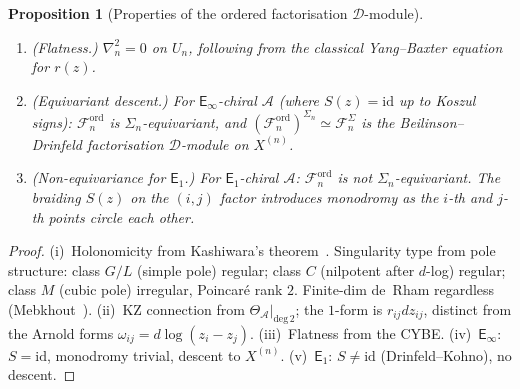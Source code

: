 \documentclass[11pt,reqno]{amsart}
\newtheorem{proposition}[theorem]{Proposition}
\theoremstyle{definition}
\theoremstyle{remark}
\newcommand{\cA}{\mathcal{A}}
\newcommand{\cD}{\mathcal{D}}
\newcommand{\cF}{\mathcal{F}}
\newcommand{\Eone}{\mathsf{E}_{1}}
\newcommand{\Einf}{\mathsf{E}_{\infty}}
\newcommand{\id}{\mathrm{id}}
\numberwithin{equation}{section}
\begin{document}
\begin{proposition}[Properties of the ordered
factorisation $\cD$-module]
\begin{enumerate}[label=\textup{(\roman*)}]
  For affine Kac--Moody at level $k$, two equivalent
  conventions coexist. In the trace-form convention,
  with $\Omega_{\mathrm{tr}}$ the Casimir built from the
  normalised trace form
  $(X,Y)_{\mathrm{tr}}
  = \mathrm{tr}(\mathrm{ad}_X \circ \mathrm{ad}_Y)
  /(2h^\vee)$:
  \begin{equation}\label{eq:kz-km}
    \nabla_n^{\mathrm{KM}}
    = \nabla^{\boxtimes n} - \sum_{i < j}
    \frac{k\,(\Omega_{\mathrm{tr}})_{ij}}{z_i - z_j}
    \, d(z_i - z_j).
  \end{equation}
  In the KZ normalisation, with $\Omega$ the inverse
  Killing form Casimir:
  \begin{equation}\label{eq:kz-km-kz}
    \nabla_n^{\mathrm{KM}}
    = \nabla^{\boxtimes n} - \sum_{i < j}
    \frac{\Omega_{ij}}{(k + h^\vee)(z_i - z_j)}
    \, d(z_i - z_j).
  \end{equation}
  The bridge identity
  $k\,(\Omega_{\mathrm{tr}})_{ij}
  = \Omega_{ij}/(k + h^\vee)$
  equates the two at generic~$k$
  (see~\cite[\S III.2]{Lorgat26I}).
  Both have a \emph{simple pole} along $\Delta_{ij}$:
  the connection is Fuchsian.
\item \textup{(Flatness.)} $\nabla_n^2 = 0$ on $U_n$,
  following from the classical Yang--Baxter equation
  for $r(z)$.
\item \textup{(Equivariant descent.)}
  For $\Einf$-chiral $\cA$ \textup{(}where $S(z) = \id$
  up to Koszul signs\textup{)}:
  $\cF_n^{\mathrm{ord}}$
  is $\Sigma_n$-equivariant, and
  $(\cF_n^{\mathrm{ord}})^{\Sigma_n}
  \simeq \cF_n^{\Sigma}$
  is the Beilinson--Drinfeld factorisation $\cD$-module
  on $X^{(n)}$.
\item \textup{(Non-equivariance for $\Eone$.)}
  For $\Eone$-chiral $\cA$:
  $\cF_n^{\mathrm{ord}}$ is \emph{not}
  $\Sigma_n$-equivariant. The braiding $S(z)$ on the
  $(i,j)$ factor introduces monodromy as the $i$-th and
  $j$-th points circle each other.
\end{enumerate}
\end{proposition}

\begin{proof}
(i)~Holonomicity from Kashiwara's theorem~\cite{Kashiwara03}.
Singularity type from pole structure: class $G/L$ (simple
pole) regular; class $C$ (nilpotent after $d$-log) regular;
class $M$ (cubic pole) irregular, Poincar\'e rank $2$.
Finite-dim de~Rham regardless (Mebkhout~\cite{Mebkhout84}).
(ii)~KZ connection from $\Theta_\cA|_{\text{deg}\,2}$;
the $1$-form is $r_{ij}dz_{ij}$, distinct from the Arnold
forms $\omega_{ij} = d\log(z_i - z_j)$.
(iii)~Flatness from the CYBE.
(iv)~$\Einf$: $S = \id$, monodromy trivial, descent to
$X^{(n)}$.
(v)~$\Eone$: $S \neq \id$ (Drinfeld--Kohno), no descent.
\end{proof}
\end{document}
